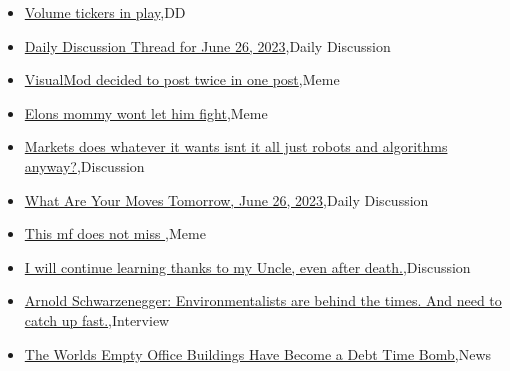 \documentclass{article}%
\begin{document}
%
\begin{itemize}%
\item%
\href{https://reddit.com/r/wallstreetbets/comments/14jfp6z/volume\_tickers\_in\_play/}{Volume tickers in play},DD%
\item%
\href{https://reddit.com/r/wallstreetbets/comments/14jd373/daily\_discussion\_thread\_for\_june\_26\_2023/}{Daily Discussion Thread for June 26, 2023},Daily Discussion%
\item%
\href{https://reddit.com/r/wallstreetbets/comments/14j0zfq/visualmod\_decided\_to\_post\_twice\_in\_one\_post/}{VisualMod decided to post twice in one post},Meme%
\item%
\href{https://reddit.com/r/wallstreetbets/comments/14j0dvb/elons\_mommy\_wont\_let\_him\_fight/}{Elons mommy wont let him fight},Meme%
\item%
\href{https://reddit.com/r/wallstreetbets/comments/14iw6qc/markets\_does\_whatever\_it\_wants\_isnt\_it\_all\_just/}{Markets does whatever it wants isnt it all just robots and algorithms anyway?},Discussion%
\item%
\href{https://reddit.com/r/wallstreetbets/comments/14ivnrn/what\_are\_your\_moves\_tomorrow\_june\_26\_2023/}{What Are Your Moves Tomorrow, June 26, 2023},Daily Discussion%
\item%
\href{https://reddit.com/r/StockMarket/comments/14j7a28/this\_mf\_does\_not\_miss/}{This mf does not miss },Meme%
\item%
\href{https://reddit.com/r/StockMarket/comments/14j244d/i\_will\_continue\_learning\_thanks\_to\_my\_uncle\_even/}{I will continue learning thanks to my Uncle, even after death.},Discussion%
\item%
\href{https://reddit.com/r/Economics/comments/14jbgop/arnold\_schwarzenegger\_environmentalists\_are/}{Arnold Schwarzenegger: Environmentalists are behind the times. And need to catch up fast.},Interview%
\item%
\href{https://reddit.com/r/Economics/comments/14ixfs5/the\_worlds\_empty\_office\_buildings\_have\_become\_a/}{The Worlds Empty Office Buildings Have Become a Debt Time Bomb},News%
\end{itemize}%
\end{document}
